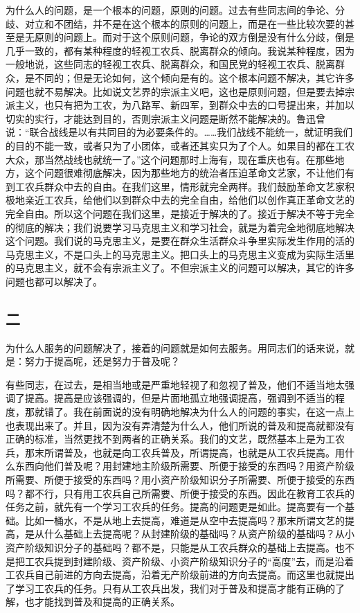 为什么人的问题，是一个根本的问题，原则的问题。过去有些同志间的争论、分歧、对立和不团结，并不是在这个根本的原则的问题上，而是在一些比较次要的甚至是无原则的问题上。而对于这个原则问题，争论的双方倒是没有什么分歧，倒是几乎一致的，都有某种程度的轻视工农兵、脱离群众的倾向。我说某种程度，因为一般地说，这些同志的轻视工农兵、脱离群众，和国民党的轻视工农兵、脱离群众，是不同的；但是无论如何，这个倾向是有的。这个根本问题不解决，其它许多问题也就不易解决。比如说文艺界的宗派主义吧，这也是原则问题，但是要去掉宗派主义，也只有把为工农，为八路军、新四军，到群众中去的口号提出来，并加以切实的实行，才能达到目的，否则宗派主义问题是断然不能解决的。鲁迅曾说：“联合战线是以有共同目的为必要条件的。……我们战线不能统一，就证明我们的目的不能一致，或者只为了小团体，或者还其实只为了个人。如果目的都在工农大众，那当然战线也就统一了。”这个问题那时上海有，现在重庆也有。在那些地方，这个问题很难彻底解决，因为那些地方的统治者压迫革命文艺家，不让他们有到工农兵群众中去的自由。在我们这里，情形就完全两样。我们鼓励革命文艺家积极地亲近工农兵，给他们以到群众中去的完全自由，给他们以创作真正革命文艺的完全自由。所以这个问题在我们这里，是接近于解决的了。接近于解决不等于完全的彻底的解决；我们说要学习马克思主义和学习社会，就是为着完全地彻底地解决这个问题。我们说的马克思主义，是要在群众生活群众斗争里实际发生作用的活的马克思主义，不是口头上的马克思主义。把口头上的马克思主义变成为实际生活里的马克思主义，就不会有宗派主义了。不但宗派主义的问题可以解决，其它的许多问题也都可以解决了。

\subsection*{二}

为什么人服务的问题解决了，接着的问题就是如何去服务。用同志们的话来说，就是：努力于提高呢，还是努力于普及呢？

有些同志，在过去，是相当地或是严重地轻视了和忽视了普及，他们不适当地太强调了提高。提高是应该强调的，但是片面地孤立地强调提高，强调到不适当的程度，那就错了。我在前面说的没有明确地解决为什么人的问题的事实，在这一点上也表现出来了。并且，因为没有弄清楚为什么人，他们所说的普及和提高就都没有正确的标准，当然更找不到两者的正确关系。我们的文艺，既然基本上是为工农兵，那末所谓普及，也就是向工农兵普及，所谓提高，也就是从工农兵提高。用什么东西向他们普及呢？用封建地主阶级所需要、所便于接受的东西吗？用资产阶级所需要、所便于接受的东西吗？用小资产阶级知识分子所需要、所便于接受的东西吗？都不行，只有用工农兵自己所需要、所便于接受的东西。因此在教育工农兵的任务之前，就先有一个学习工农兵的任务。提高的问题更是如此。提高要有一个基础。比如一桶水，不是从地上去提高，难道是从空中去提高吗？那末所谓文艺的提高，是从什么基础上去提高呢？从封建阶级的基础吗？从资产阶级的基础吗？从小资产阶级知识分子的基础吗？都不是，只能是从工农兵群众的基础上去提高。也不是把工农兵提到封建阶级、资产阶级、小资产阶级知识分子的“高度”去，而是沿着工农兵自己前进的方向去提高，沿着无产阶级前进的方向去提高。而这里也就提出了学习工农兵的任务。只有从工农兵出发，我们对于普及和提高才能有正确的了解，也才能找到普及和提高的正确关系。

